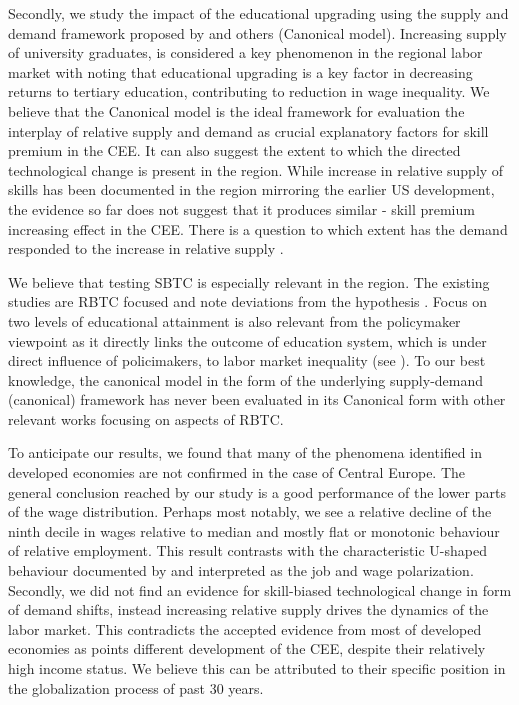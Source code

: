 \documentclass[11pt]{article}
\begin{document}
Secondly, we study the impact of the educational upgrading using the supply and demand framework proposed by \cite{katz1992changes} and others (Canonical model).  Increasing supply of university graduates, is considered a key phenomenon in the regional labor market \citep{arendt2019technical, hardy2018educational} with \cite{magda2021firms} noting that educational upgrading is a key factor in decreasing returns to tertiary education, contributing to reduction in wage inequality. We believe that the Canonical model is the ideal framework for evaluation the interplay of relative supply and demand as crucial explanatory factors for skill premium in the CEE. It can also suggest the extent to which the directed technological change is present in the region. While increase in relative supply of skills has been documented in the region mirroring the earlier US development, the evidence so far does not suggest that it produces similar - skill premium increasing effect in the CEE. There is a question to which extent has the demand responded to the increase in relative supply \cite{acemoglu2002directed}. 

We believe that testing SBTC is especially relevant in the region. The existing studies are RBTC focused and note deviations from the hypothesis \citep{arendt2019technical, hardy2018educational}. Focus on two levels of educational attainment is also relevant from the policymaker viewpoint as it directly links the outcome of education system, which is under direct influence of policimakers, to labor market inequality (see \citep{goldin2010race}). To our best knowledge, the canonical model in the form of the underlying supply-demand (canonical) framework has never been evaluated in its Canonical form with other relevant works focusing on aspects of RBTC.

To anticipate our results, we found that many of the phenomena identified in developed economies are not confirmed in the case of Central Europe. The general conclusion reached by our study is a good performance of the lower parts of the wage distribution. Perhaps most notably, we see a relative decline of the ninth decile in wages relative to median and mostly flat or monotonic behaviour of relative employment. This result contrasts with the characteristic U-shaped behaviour documented by \citet{acemoglu2012does} and interpreted as the job and wage polarization. Secondly, we did not find an evidence for skill-biased technological change in form of demand shifts, instead increasing relative supply drives the dynamics of the labor market. This contradicts the accepted evidence from most of developed economies as points different development of the CEE, despite their relatively high income status. We believe this can be attributed to their specific position in the globalization process of past 30 years. %
\end{document}
